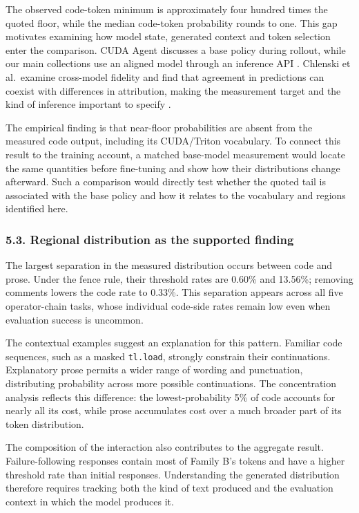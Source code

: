 \documentclass[
  11pt,
]{article}
\begin{document}
The observed code-token minimum is approximately four hundred times the
quoted floor, while the median code-token probability rounds to one.
This gap motivates examining how model state, generated context and
token selection enter the comparison. CUDA Agent discusses a base policy
during rollout, while our main collections use an aligned model through
an inference API \citep{cudaagent}. Chlenski et al.~examine cross-model
fidelity and find that agreement in predictions can coexist with
differences in attribution, making the measurement target and the kind
of inference important to specify \citep{surrogate}.

The empirical finding is that near-floor probabilities are absent from
the measured code output, including its CUDA/Triton vocabulary. To
connect this result to the training account, a matched base-model
measurement would locate the same quantities before fine-tuning and show
how their distributions change afterward. Such a comparison would
directly test whether the quoted tail is associated with the base policy
and how it relates to the vocabulary and regions identified here.

\hypertarget{regional-distribution-as-the-supported-finding}{%
\subsubsection{5.3. Regional distribution as the supported
finding}\label{regional-distribution-as-the-supported-finding}}

The largest separation in the measured distribution occurs between code
and prose. Under the fence rule, their threshold rates are 0.60\% and
13.56\%; removing comments lowers the code rate to 0.33\%. This
separation appears across all five operator-chain tasks, whose
individual code-side rates remain low even when evaluation success is
uncommon.

The contextual examples suggest an explanation for this pattern.
Familiar code sequences, such as a masked \texttt{tl.load}, strongly
constrain their continuations. Explanatory prose permits a wider range
of wording and punctuation, distributing probability across more
possible continuations. The concentration analysis reflects this
difference: the lowest-probability 5\% of code accounts for nearly all
its cost, while prose accumulates cost over a much broader part of its
token distribution.

The composition of the interaction also contributes to the aggregate
result. Failure-following responses contain most of Family B's tokens
and have a higher threshold rate than initial responses. Understanding
the generated distribution therefore requires tracking both the kind of
text produced and the evaluation context in which the model produces it.
\end{document}
